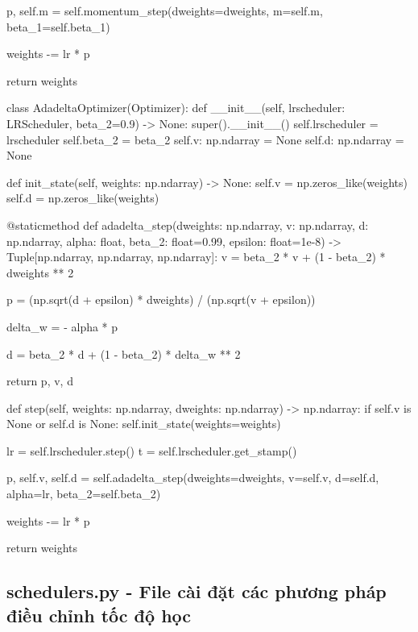 \documentclass[14pt, a4paper]{article}
\theoremstyle{sltheorem}
\theoremstyle{soltheorem}
\begin{document}
\begin{python}
        p, self.m = self.momentum_step(dweights=dweights, m=self.m, beta_1=self.beta_1)
        
        weights -= lr * p
        
        return weights
    
    
class AdadeltaOptimizer(Optimizer):
    def __init__(self, lrscheduler: LRScheduler, beta_2=0.9) -> None:
        super().__init__()
        self.lrscheduler = lrscheduler
        self.beta_2 = beta_2
        self.v: np.ndarray = None
        self.d: np.ndarray = None
        
    def init_state(self, weights: np.ndarray) -> None:
        self.v = np.zeros_like(weights)
        self.d = np.zeros_like(weights)
        
    
    @staticmethod
    def adadelta_step(dweights: np.ndarray, v: np.ndarray, d: np.ndarray, alpha: float, beta_2: float=0.99, epsilon: float=1e-8) -> Tuple[np.ndarray, np.ndarray, np.ndarray]:
        v = beta_2 * v + (1 - beta_2) * dweights ** 2

        p = (np.sqrt(d + epsilon) * dweights) / (np.sqrt(v + epsilon))

        delta_w = - alpha * p

        d = beta_2 * d + (1 - beta_2) * delta_w ** 2

        return p, v, d
    
    
    def step(self, weights: np.ndarray, dweights: np.ndarray) -> np.ndarray:
        if self.v is None or self.d is None:
            self.init_state(weights=weights)
        
        lr = self.lrscheduler.step()
        t = self.lrscheduler.get_stamp()
        
        p, self.v, self.d = self.adadelta_step(dweights=dweights, 
                                               v=self.v, 
                                               d=self.d, 
                                               alpha=lr,
                                               beta_2=self.beta_2)
        
        weights -= lr * p
        
        return weights
    
    
\end{python}

\subsection{schedulers.py - File cài đặt các phương pháp điều chỉnh tốc độ học}
\end{document}
